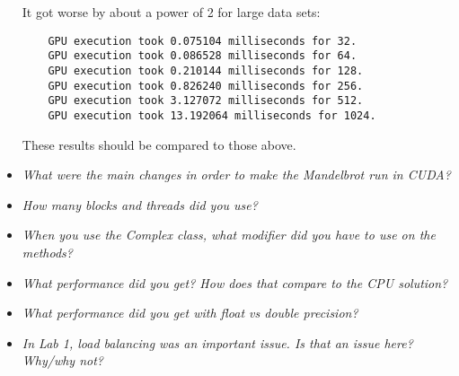 \documentclass[a4paper,12pt]{article}
\begin{document}
\begin{itemize}
  It got worse by about a power of 2 for large data sets:

  \begin{lstlisting}
    GPU execution took 0.075104 milliseconds for 32.
    GPU execution took 0.086528 milliseconds for 64.
    GPU execution took 0.210144 milliseconds for 128.
    GPU execution took 0.826240 milliseconds for 256.
    GPU execution took 3.127072 milliseconds for 512.
    GPU execution took 13.192064 milliseconds for 1024.
  \end{lstlisting}

  These results should be compared to those above.


\item \textit{What were the main changes in order to make the Mandelbrot run in CUDA?}


\item \textit{How many blocks and threads did you use?}


\item \textit{When you use the Complex class, what modifier did you have to use on the methods?}


\item \textit{What performance did you get? How does that compare to the CPU solution?}


\item \textit{What performance did you get with float vs double precision?}


\item \textit{In Lab 1, load balancing was an important issue. Is that an issue here? Why/why not?}

\end{itemize}
\end{document}
